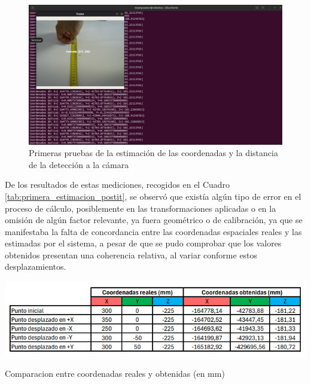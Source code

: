   \begin{figure}[H]
     \centering
     \begin{center}
       \includegraphics[width=115mm]{figs/Punto inicial 30cm.png}
     \end{center}
     \caption{Primeras pruebas de la estimación de las coordenadas y la distancia de la detección a la cámara}
    \label{fig:primera_estimacion_postit}
  \end{figure}

De los resultados de estas mediciones, recogidos en el Cuadro \ref{tab:primera_estimacion_postit}, se observó que existía algún tipo de error en el proceso de cálculo, posiblemente en las transformaciones aplicadas o en la omisión de algún factor relevante, ya fuera geométrico o de calibración, ya que se manifestaba la falta de concordancia entre las coordenadas espaciales reales y las estimadas por el sistema, a pesar de que se pudo comprobar que los valores obtenidos presentan una coherencia relativa, al variar conforme estos desplazamientos.

  \begin{table}[H]
     \centering
     \begin{center}
       \includegraphics[width=140mm]{figs/Primer resultados postit.png}
     \end{center}
     \caption{Comparacion entre coordenadas reales y obtenidas (en mm)}
    \label{tab:primera_estimacion_postit}
  \end{table}

